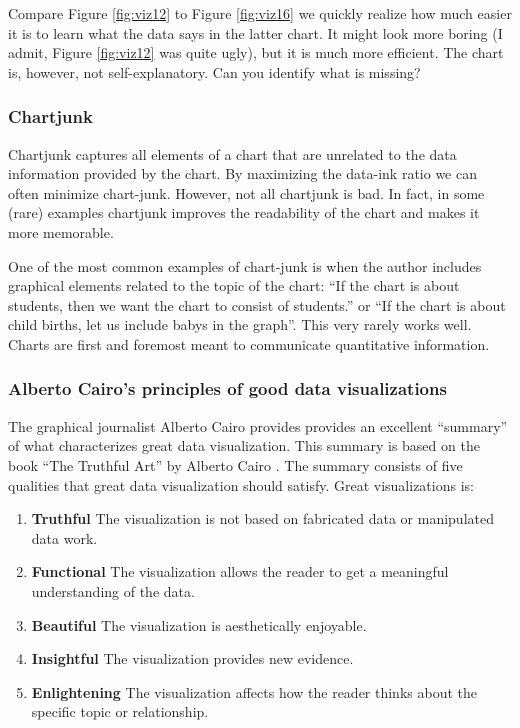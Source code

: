 \documentclass[]{book}
\begin{document}
Compare Figure \ref{fig:viz12} to Figure \ref{fig:viz16} we quickly realize how much easier it is to learn what the data says in the latter chart. It might look more boring (I admit, Figure \ref{fig:viz12} was quite ugly), but it is much more efficient. The chart is, however, not self-explanatory. Can you identify what is missing?

\hypertarget{chartjunk}{%
\subsubsection{Chartjunk}\label{chartjunk}}

Chartjunk captures all elements of a chart that are unrelated to the data information provided by the chart. By maximizing the data-ink ratio we can often minimize chart-junk. However, not all chartjunk is bad. In fact, in some (rare) examples chartjunk improves the readability of the chart and makes it more memorable.

One of the most common examples of chart-junk is when the author includes graphical elements related to the topic of the chart: ``If the chart is about students, then we want the chart to consist of students.'' or ``If the chart is about child births, let us include babys in the graph''. This very rarely works well. Charts are first and foremost meant to communicate quantitative information.

\hypertarget{alberto-cairos-principles-of-good-data-visualizations}{%
\subsubsection{Alberto Cairo's principles of good data visualizations}\label{alberto-cairos-principles-of-good-data-visualizations}}

The graphical journalist Alberto Cairo provides provides an excellent ``summary'' of what characterizes great data visualization. This summary is based on the book ``The Truthful Art'' by Alberto Cairo \citep{cairo}. The summary consists of five qualities that great data visualization should satisfy. Great visualizations is:

\begin{enumerate}
\def\labelenumi{\arabic{enumi}.}
\item
  \textbf{Truthful}
  The visualization is not based on fabricated data or manipulated data work.
\item
  \textbf{Functional}
  The visualization allows the reader to get a meaningful understanding of the data.
\item
  \textbf{Beautiful}
  The visualization is aesthetically enjoyable.
\item
  \textbf{Insightful}
  The visualization provides new evidence.
\item
  \textbf{Enlightening}
  The visualization affects how the reader thinks about the specific topic or relationship.
\end{enumerate}
\end{document}
